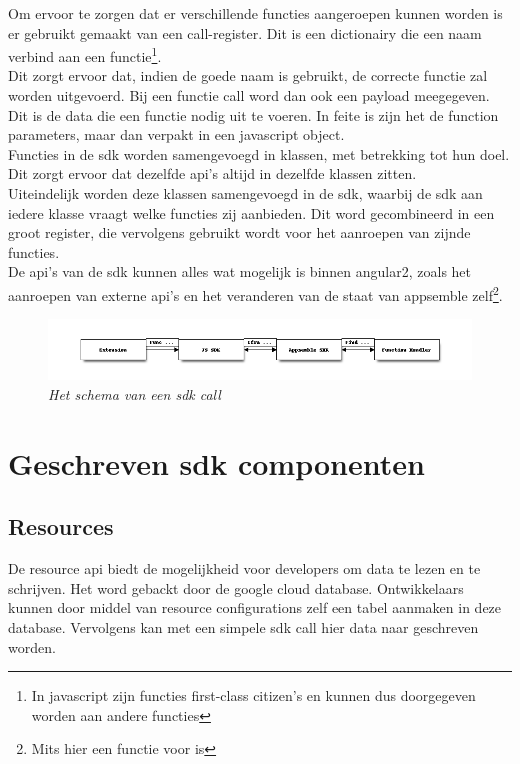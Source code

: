 Om ervoor te zorgen dat er verschillende functies aangeroepen kunnen worden is er gebruikt gemaakt van een call-register. Dit is een dictionairy die een naam verbind aan een functie\footnote{In javascript zijn functies first-class citizen's en kunnen dus doorgegeven worden aan andere functies}. \\

Dit zorgt ervoor dat, indien de goede naam is gebruikt, de correcte functie zal worden uitgevoerd. Bij een functie call word dan ook een payload meegegeven. Dit is de data die een functie nodig uit te voeren. In feite is zijn het de function parameters, maar dan verpakt in een javascript object. \\

Functies in de sdk worden samengevoegd in klassen, met betrekking tot hun doel. Dit zorgt ervoor dat dezelfde api's altijd in dezelfde klassen zitten. \\

Uiteindelijk worden deze klassen samengevoegd in de sdk, waarbij de sdk aan iedere klasse vraagt welke functies zij aanbieden. Dit word gecombineerd in een groot register, die vervolgens gebruikt wordt voor het aanroepen van zijnde functies. \\

De api's van de sdk kunnen alles wat mogelijk is binnen angular2, zoals het aanroepen van externe api's en het veranderen van de staat van appsemble zelf\footnote{Mits hier een functie voor is}.

\begin{figure}[h]
	\includegraphics[width=1\textwidth]{diagrams/sdk-call.png}	
	\caption{\textit{Het schema van een sdk call}}
\end{figure}
\section{Geschreven sdk componenten}

\subsection{Resources}

De resource api biedt de mogelijkheid voor developers om data te lezen en te schrijven. Het word gebackt door de google cloud database. Ontwikkelaars kunnen door middel van resource configurations zelf een tabel aanmaken in deze database. Vervolgens kan met een simpele sdk call hier data naar geschreven worden.